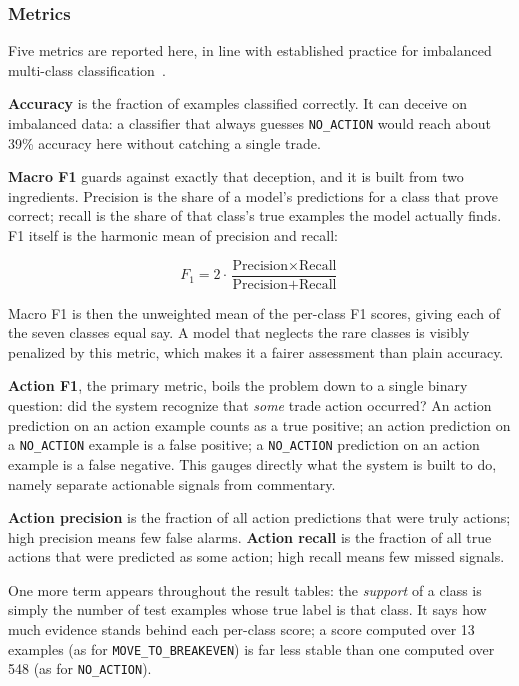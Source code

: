 \subsubsection{Metrics}
\label{sec:metrics}

Five metrics are reported here, in line with established practice for imbalanced multi-class classification~\cite{sokolova2009systematic}.

\textbf{Accuracy} is the fraction of examples classified correctly. It can deceive on imbalanced data: a classifier that always guesses \texttt{NO\_ACTION} would reach about 39\% accuracy here without catching a single trade.

\textbf{Macro F1} guards against exactly that deception, and it is built from two ingredients. Precision is the share of a model's predictions for a class that prove correct; recall is the share of that class's true examples the model actually finds. F1 itself is the harmonic mean of precision and recall:

\begin{equation}
F_1 = 2 \cdot \frac{\text{Precision} \times \text{Recall}}{\text{Precision} + \text{Recall}}
\label{eq:f1}
\end{equation}

\noindent Macro F1 is then the unweighted mean of the per-class F1 scores, giving each of the seven classes equal say. A model that neglects the rare classes is visibly penalized by this metric, which makes it a fairer assessment than plain accuracy.

\textbf{Action F1}, the primary metric, boils the problem down to a single binary question: did the system recognize that \emph{some} trade action occurred? An action prediction on an action example counts as a true positive; an action prediction on a \texttt{NO\_ACTION} example is a false positive; a \texttt{NO\_ACTION} prediction on an action example is a false negative. This gauges directly what the system is built to do, namely separate actionable signals from commentary.

\textbf{Action precision} is the fraction of all action predictions that were truly actions; high precision means few false alarms. \textbf{Action recall} is the fraction of all true actions that were predicted as some action; high recall means few missed signals.

One more term appears throughout the result tables: the \emph{support} of a class is simply the number of test examples whose true label is that class. It says how much evidence stands behind each per-class score; a score computed over 13 examples (as for \texttt{MOVE\_TO\_BREAKEVEN}) is far less stable than one computed over 548 (as for \texttt{NO\_ACTION}).


